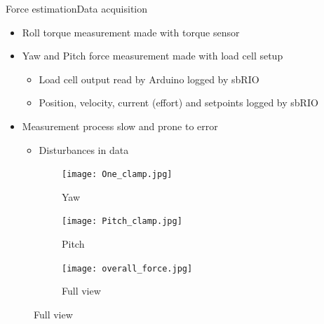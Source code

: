 \begin{frame}{Force estimation}{Data acquisition}
\begin{itemize}
\item Roll torque measurement made with torque sensor
\item Yaw and Pitch force measurement made with load cell setup
\begin{itemize}
\item Load cell output read by Arduino logged by sbRIO
\item Position, velocity, current (effort) and setpoints logged by sbRIO
\end{itemize}
\item Measurement process slow and prone to error
\begin{itemize}
\item Disturbances in data
\end{itemize}
\end{itemize}
\begin{figure}
\centering
    \begin{subfigure}[t]{0.32\textwidth}
        \centering
        \texttt{[image: One\_clamp.jpg]} 
        \caption{Yaw} \label{fig:mes1}
    \end{subfigure}
    \begin{subfigure}[t]{0.32\textwidth}
        \centering
        \texttt{[image: Pitch\_clamp.jpg]} 
        \caption{Pitch} \label{fig:mes2}
    \end{subfigure}
        \begin{subfigure}[t]{0.32\textwidth}
        \centering
        \texttt{[image: overall\_force.jpg]} 
        \caption{Full view} \label{fig:mes3}
    \end{subfigure}
\end{figure}
\end{frame}

